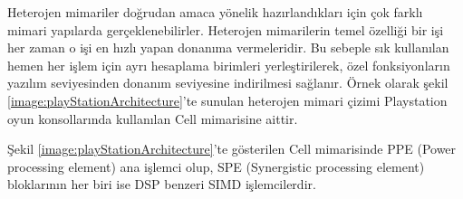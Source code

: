 Heterojen mimariler doğrudan amaca yönelik hazırlandıkları için çok farklı mimari yapılarda gerçeklenebilirler. Heterojen mimarilerin temel özelliği bir işi her zaman o işi en hızlı yapan donanıma vermeleridir. Bu sebeple sık kullanılan hemen her işlem için ayrı hesaplama birimleri yerleştirilerek, özel fonksiyonların yazılım seviyesinden donanım seviyesine indirilmesi sağlanır. Örnek olarak şekil \ref{image:playStationArchitecture}'te sunulan heterojen mimari çizimi Playstation oyun konsollarında kullanılan Cell mimarisine aittir. \par

Şekil \ref{image:playStationArchitecture}'te gösterilen Cell mimarisinde PPE (Power processing element) ana işlemci olup, SPE (Synergistic processing element) bloklarının her biri ise DSP benzeri SIMD işlemcilerdir.